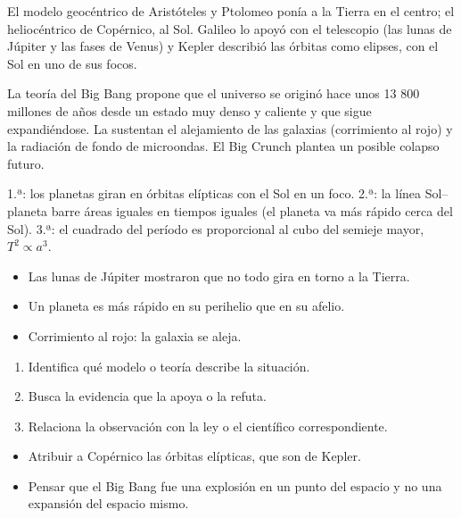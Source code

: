 \documentclass[10pt,a4paper,twocolumn]{article}
\begin{document}
El modelo geocéntrico de Aristóteles y Ptolomeo ponía a la Tierra en el centro; el heliocéntrico de Copérnico, al Sol. Galileo lo apoyó con el telescopio (las lunas de Júpiter y las fases de Venus) y Kepler describió las órbitas como elipses, con el Sol en uno de sus focos.

La teoría del Big Bang propone que el universo se originó hace unos 13 800 millones de años desde un estado muy denso y caliente y que sigue expandiéndose. La sustentan el alejamiento de las galaxias (corrimiento al rojo) y la radiación de fondo de microondas. El Big Crunch plantea un posible colapso futuro.

\begin{ley}
1.ª: los planetas giran en órbitas elípticas con el Sol en un foco. 2.ª: la línea Sol–planeta barre áreas iguales en tiempos iguales (el planeta va más rápido cerca del Sol). 3.ª: el cuadrado del período es proporcional al cubo del semieje mayor, $T^2\propto a^3$.
\end{ley}

\begin{ideasclave}
\begin{itemize}
  \item Las lunas de Júpiter mostraron que no todo gira en torno a la Tierra.
  \item Un planeta es más rápido en su perihelio que en su afelio.
  \item Corrimiento al rojo: la galaxia se aleja.
\end{itemize}
\end{ideasclave}

\begin{metodo}
\begin{enumerate}
  \item Identifica qué modelo o teoría describe la situación.
  \item Busca la evidencia que la apoya o la refuta.
  \item Relaciona la observación con la ley o el científico correspondiente.
\end{enumerate}
\end{metodo}

\begin{errorfrecuente}
\begin{itemize}
  \item Atribuir a Copérnico las órbitas elípticas, que son de Kepler.
  \item Pensar que el Big Bang fue una explosión en un punto del espacio y no una expansión del espacio mismo.
\end{itemize}
\end{errorfrecuente}
\end{document}

